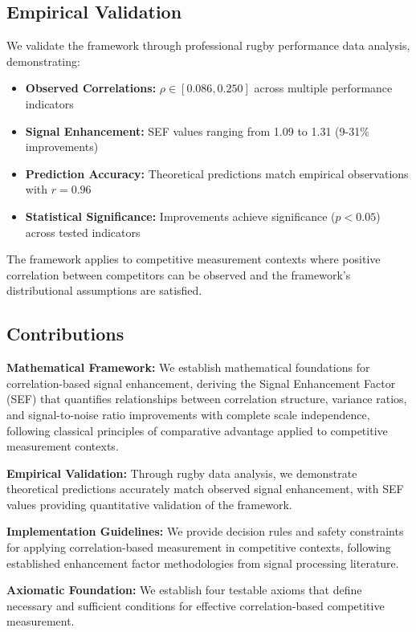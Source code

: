 \subsection{Empirical Validation}

We validate the framework through professional rugby performance data analysis, demonstrating:

\begin{itemize}
    \item \textbf{Observed Correlations:} $\rho \in [0.086, 0.250]$ across multiple performance indicators
    \item \textbf{Signal Enhancement:} SEF values ranging from 1.09 to 1.31 (9-31\% improvements)
    \item \textbf{Prediction Accuracy:} Theoretical predictions match empirical observations with $r = 0.96$
    \item \textbf{Statistical Significance:} Improvements achieve significance ($p < 0.05$) across tested indicators
\end{itemize}

The framework applies to competitive measurement contexts where positive correlation between competitors can be observed and the framework's distributional assumptions are satisfied.

\subsection{Contributions}

\textbf{Mathematical Framework:} We establish mathematical foundations for correlation-based signal enhancement, deriving the Signal Enhancement Factor (SEF) that quantifies relationships between correlation structure, variance ratios, and signal-to-noise ratio improvements with complete scale independence, following classical principles of comparative advantage \cite{ricardo1817principles} applied to competitive measurement contexts.

\textbf{Empirical Validation:} Through rugby data analysis, we demonstrate theoretical predictions accurately match observed signal enhancement, with SEF values providing quantitative validation of the framework.

\textbf{Implementation Guidelines:} We provide decision rules and safety constraints for applying correlation-based measurement in competitive contexts, following established enhancement factor methodologies from signal processing literature.

\textbf{Axiomatic Foundation:} We establish four testable axioms that define necessary and sufficient conditions for effective correlation-based competitive measurement.

